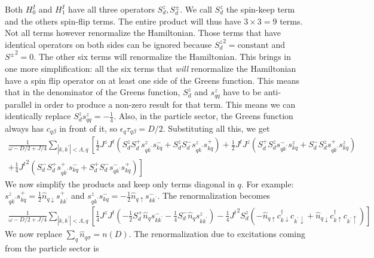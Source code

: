 Both \(H^I_0\) and \(H^I_1\) have all three operators \(S_d^z, S_d^\pm\). We call \(S_d^z\) the spin-keep term and the others spin-flip terms. The entire product will thus have \(3\times 3 = 9\) terms. Not all terms however renormalize the Hamiltonian. Those terms that have identical operators on both sides can be ignored because \({S_d^z}^2 = \text{constant}\) and \({S^\pm}^2 = 0\). The other six terms will renormalize the Hamiltonian. This brings in one more simplification: all the six terms that \textit{will} renormalize the Hamiltonian have a spin flip operator on at least one side of the Greens function. This means that in the denominator of the Greens function, \(S_d^z\) and \(s^z_{qq}\) have to be anti-parallel in order to produce a non-zero result for that term. This means we can identically replace \(S_d^z s^z_{qq} = -\frac{1}{4}\). Also, in the particle sector, the Greens function always has \(c_{q\beta}\) in front of it, so \(\epsilon_q \tau_{q\beta} = D/2\). Substituting all this, we get
\begin{equation}\begin{aligned}
	\frac{1}{\omega - D/2 + J/4}\sum_{|k,k^\prime|<\Lambda,q}\left[\frac{1}{2}J^z J^t \left(S_d^z S_d^+ s^z_{qk^\prime}s^-_{kq} + S_d^z S_d^- s^z_{qk^\prime}s^+_{kq}\right) + \frac{1}{2}J^t J^z \left(S_d^+ S_d^z s^-_{qk^\prime}s^z_{kq} + S_d^- S_d^z s^+_{qk^\prime}s^z_{kq}\right)\right.\\
+\left.\frac{1}{4}{J^t}^2 \left(S_d^- S_d^+ s^+_{qk^\prime}s^-_{kq} + S_d^+ S_d^- s^-_{qk^\prime}s^+_{kq}\right)\right]
\end{aligned}\end{equation}
We now simplify the products and keep only terms diagonal in \(q\). For example: \(s^z_{qk^\prime}s^+_{kq} = \frac{1}{2}\hat n_{q \downarrow}s^+_{kk^\prime}\) and \(s^z_{qk^\prime}s^-_{kq} = -\frac{1}{2}\hat n_{q \uparrow}s^-_{kk^\prime}\). The renormalization becomes
\begin{equation}\begin{aligned}
	\frac{1}{\omega - D/2 + J/4}\sum_{|k,k^\prime|<\Lambda,q}\left[\frac{1}{4}J^z J^t \left(-\frac{1}{2}S_d^+ \hat n_{q}s^-_{kk^\prime} - \frac{1}{4}S_d^- \hat n_{q} s^z_{kk^\prime}\right) - \frac{1}{4}{J^t}^2 S_d^z\left(-\hat n_{q \uparrow}c^\dagger_{k \downarrow}c_{k^\prime \downarrow} + \hat n_{q \downarrow}c^\dagger_{k \uparrow}c_{k^\prime \uparrow}\right)\right]
\end{aligned}\end{equation}
We now replace \(\sum_q \hat n_{q\sigma} = n(D)\). The renormalization due to excitations coming from the particle sector is
